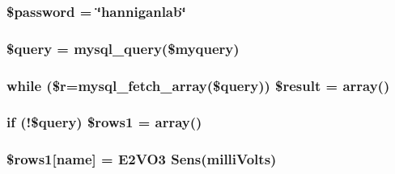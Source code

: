 \subsubsection[{\texorpdfstring{\$password}{$password}}]{\setlength{\rightskip}{0pt plus 5cm}\$password = \char`\"{}hanniganlab\char`\"{}}\hypertarget{_e2___j_s_o_n_8php_a607686ef9f99ea7c42f4f3dd3dbb2b0d}{}\label{_e2___j_s_o_n_8php_a607686ef9f99ea7c42f4f3dd3dbb2b0d}
\subsubsection[{\texorpdfstring{\$query}{$query}}]{\setlength{\rightskip}{0pt plus 5cm}\$query = mysql\+\_\+query(\$myquery)}\hypertarget{_e2___j_s_o_n_8php_af59a5f7cd609e592c41dc3643efd3c98}{}\label{_e2___j_s_o_n_8php_af59a5f7cd609e592c41dc3643efd3c98}
\subsubsection[{\texorpdfstring{\$result}{$result}}]{\setlength{\rightskip}{0pt plus 5cm}while (\$r=mysql\+\_\+fetch\+\_\+array(\$query)) \$result = array()}\hypertarget{_e2___j_s_o_n_8php_a9148136d1e11f768be4f805d7e567da2}{}\label{_e2___j_s_o_n_8php_a9148136d1e11f768be4f805d7e567da2}
\subsubsection[{\texorpdfstring{\$rows1}{$rows1}}]{\setlength{\rightskip}{0pt plus 5cm}if (!\$query) \$rows1 = array()}\hypertarget{_e2___j_s_o_n_8php_a15da33e0f4006a60bff01708cb5d1428}{}\label{_e2___j_s_o_n_8php_a15da33e0f4006a60bff01708cb5d1428}
\subsubsection[{\texorpdfstring{\$rows1}{$rows1}}]{\setlength{\rightskip}{0pt plus 5cm}\$rows1\mbox{[}\textquotesingle{}name\textquotesingle{}\mbox{]} = \textquotesingle{}E2\+V\+O3 Sens(milli\+Volts)\textquotesingle{}}\hypertarget{_e2___j_s_o_n_8php_aece741d5099bb229e07df7a57776cfaa}{}\label{_e2___j_s_o_n_8php_aece741d5099bb229e07df7a57776cfaa}
